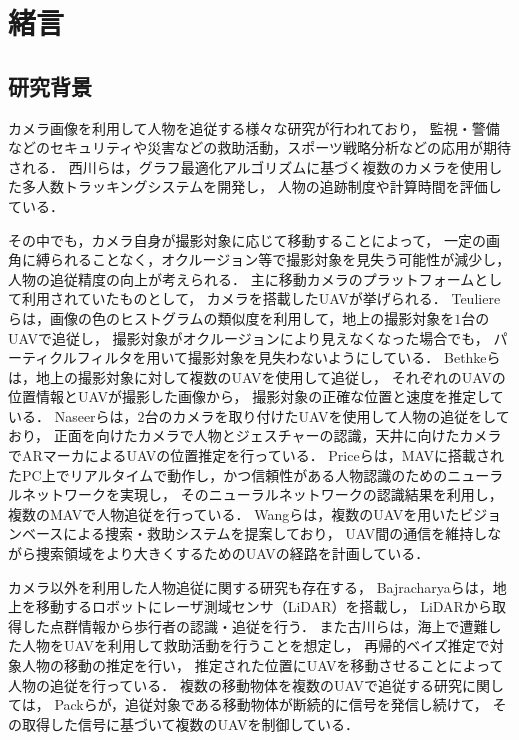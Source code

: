 \documentclass[autodetect-engine,dvipdfmx-if-dvi,ja=standard,a4j,jbase=11pt,magstyle=nomag*]{bxjsreport}
\begin{document}
\chapter{緒言}

\section{研究背景}
カメラ画像を利用して人物を追従する様々な研究が行われており，
監視・警備などのセキュリティや災害などの救助活動，スポーツ戦略分析などの応用が期待される．
西川らは，グラフ最適化アルゴリズムに基づく複数のカメラを使用した多人数トラッキングシステムを開発し，
人物の追跡制度や計算時間を評価している\cite{nishikawa_2018, nishikawa_2018_2}．

その中でも，カメラ自身が撮影対象に応じて移動することによって，
一定の画角に縛られることなく，オクルージョン等で撮影対象を見失う可能性が減少し，
人物の追従精度の向上が考えられる．
主に移動カメラのプラットフォームとして利用されていたものとして，
カメラを搭載したUAVが挙げられる．
Teuliereらは，画像の色のヒストグラムの類似度を利用して，地上の撮影対象を$1$台のUAVで追従し，
撮影対象がオクルージョンにより見えなくなった場合でも，
パーティクルフィルタを用いて撮影対象を見失わないようにしている\cite{Teuliere_2011}．
Bethkeらは，地上の撮影対象に対して複数のUAVを使用して追従し，
それぞれのUAVの位置情報とUAVが撮影した画像から，
撮影対象の正確な位置と速度を推定している\cite{bethke_2007}．
Naseerらは，$2$台のカメラを取り付けたUAVを使用して人物の追従をしており，
正面を向けたカメラで人物とジェスチャーの認識，天井に向けたカメラでARマーカによるUAVの位置推定を行っている\cite{nasser_2013}．
Priceらは，MAVに搭載されたPC上でリアルタイムで動作し，かつ信頼性がある人物認識のためのニューラルネットワークを実現し，
そのニューラルネットワークの認識結果を利用し，複数のMAVで人物追従を行っている\cite{price_2018}．
Wangらは，複数のUAVを用いたビジョンベースによる捜索・救助システムを提案しており，
UAV間の通信を維持しながら捜索領域をより大きくするためのUAVの経路を計画している\cite{wang_2009}．

カメラ以外を利用した人物追従に関する研究も存在する，
Bajracharyaらは，地上を移動するロボットにレーザ測域センサ（LiDAR）を搭載し，
LiDARから取得した点群情報から歩行者の認識・追従を行う\cite{bajracharya_2009}．
また古川らは，海上で遭難した人物をUAVを利用して救助活動を行うことを想定し，
再帰的ベイズ推定で対象人物の移動の推定を行い，
推定された位置にUAVを移動させることによって人物の追従を行っている\cite{furukawa_2006, furukawa_2012}．
複数の移動物体を複数のUAVで追従する研究に関しては，
Packらが，追従対象である移動物体が断続的に信号を発信し続けて，
その取得した信号に基づいて複数のUAVを制御している\cite{pack_2009}．
\end{document}

